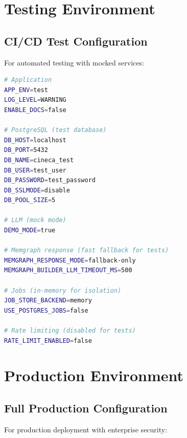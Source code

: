 \documentclass[a4paper,twoside]{sapthesis}
\begin{document}
\section{Testing Environment}
\label{app:config:test}

\subsection{CI/CD Test Configuration}

For automated testing with mocked services:

\begin{lstlisting}[language=bash,caption={.env.test}]
# Application
APP_ENV=test
LOG_LEVEL=WARNING
ENABLE_DOCS=false

# PostgreSQL (test database)
DB_HOST=localhost
DB_PORT=5432
DB_NAME=cineca_test
DB_USER=test_user
DB_PASSWORD=test_password
DB_SSLMODE=disable
DB_POOL_SIZE=5

# LLM (mock mode)
DEMO_MODE=true

# Memgraph response (fast fallback for tests)
MEMGRAPH_RESPONSE_MODE=fallback-only
MEMGRAPH_BUILDER_LLM_TIMEOUT_MS=500

# Jobs (in-memory for isolation)
JOB_STORE_BACKEND=memory
USE_POSTGRES_JOBS=false

# Rate limiting (disabled for tests)
RATE_LIMIT_ENABLED=false
\end{lstlisting}

\section{Production Environment}
\label{app:config:prod}

\subsection{Full Production Configuration}

For production deployment with enterprise security:
\end{document}
